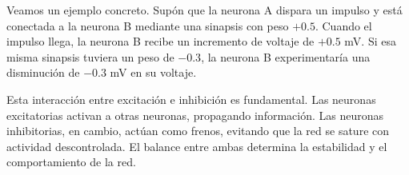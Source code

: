Veamos un ejemplo concreto. Supón que la neurona A dispara un impulso y está conectada a la neurona B mediante una sinapsis con peso $+0.5$. Cuando el impulso llega, la neurona B recibe un incremento de voltaje de $+0.5$ mV. Si esa misma sinapsis tuviera un peso de $-0.3$, la neurona B experimentaría una disminución de $-0.3$ mV en su voltaje.

Esta interacción entre excitación e inhibición es fundamental. Las neuronas excitatorias activan a otras neuronas, propagando información. Las neuronas inhibitorias, en cambio, actúan como frenos, evitando que la red se sature con actividad descontrolada. El balance entre ambas determina la estabilidad y el comportamiento de la red.







